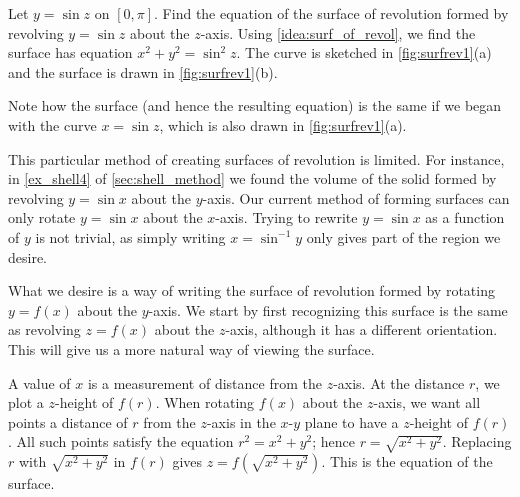 
\begin{example}\label{ex_surfrev1}
Let $y=\sin z$ on $[0,\pi]$. Find the equation of the surface of revolution formed by revolving $y=\sin z$ about the $z$-axis.
\solution
Using \autoref{idea:surf_of_revol}, we find the surface has equation $x^2+y^2=\sin^2z$. The curve is sketched in \autoref{fig:surfrev1}(a) and the surface is drawn in \autoref{fig:surfrev1}(b).

Note how the surface (and hence the resulting equation) is the same if we began with the curve $x=\sin z$, which is also drawn in \autoref{fig:surfrev1}(a).
\end{example}

This particular method of creating surfaces of revolution is limited. For instance, in \autoref{ex_shell4} of \autoref{sec:shell_method} we found the volume  of the solid formed by revolving $y=\sin x$ about the $y$-axis. Our current method of forming surfaces can only rotate $y=\sin x$ about the $x$-axis. Trying to rewrite $y=\sin x$ as a function of $y$ is not trivial, as simply writing $x=\sin^{-1}y$ only gives part of the region we desire.

What we desire is a way of writing the surface of revolution formed by rotating $y=f(x)$ about the $y$-axis. We start by first recognizing this surface is the same as revolving $z=f(x)$ about the $z$-axis, although it has a different orientation. This will give us a more natural way of viewing the surface. 

A value of $x$ is a measurement of distance from the $z$-axis. At the distance $r$, we plot a $z$-height of $f(r)$. When rotating $f(x)$ about the $z$-axis, we want all points a distance of $r$ from the $z$-axis in the $x$-$y$ plane to have a $z$-height of $f(r)$. All such points satisfy the equation $r^2=x^2+y^2$; hence $r=\sqrt{x^2+y^2}$. Replacing $r$ with $\sqrt{x^2+y^2}$ in $f(r)$ gives $z=f(\sqrt{x^2+y^2})$. This is the equation of the surface.


